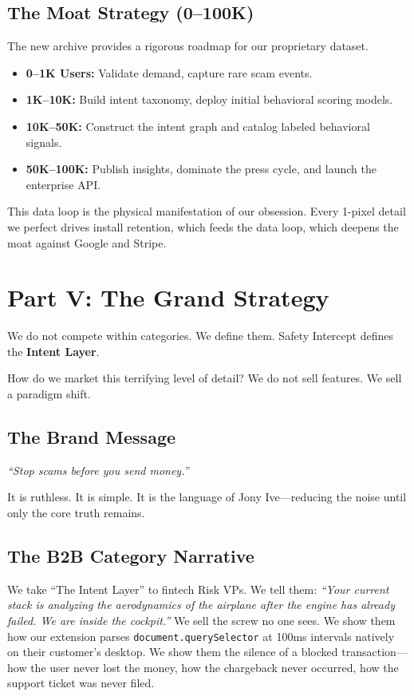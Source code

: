 \documentclass[11pt, letterpaper]{article}
\begin{document}
\subsection*{The Moat Strategy (0--100K)}
The new archive provides a rigorous roadmap for our proprietary dataset. 
\begin{itemize}
    \item \textbf{0--1K Users:} Validate demand, capture rare scam events.
    \item \textbf{1K--10K:} Build intent taxonomy, deploy initial behavioral scoring models.
    \item \textbf{10K--50K:} Construct the intent graph and catalog labeled behavioral signals.
    \item \textbf{50K--100K:} Publish insights, dominate the press cycle, and launch the enterprise API.
\end{itemize}
This data loop is the physical manifestation of our obsession. Every 1-pixel detail we perfect drives install retention, which feeds the data loop, which deepens the moat against Google and Stripe.

\section*{Part V: The Grand Strategy}

We do not compete within categories. We define them. Safety Intercept defines the \textbf{Intent Layer}.

How do we market this terrifying level of detail? We do not sell features. We sell a paradigm shift.

\subsection*{The Brand Message}
\begin{center}
\textit{``Stop scams before you send money.''}
\end{center}
It is ruthless. It is simple. It is the language of Jony Ive---reducing the noise until only the core truth remains.

\subsection*{The B2B Category Narrative}
We take ``The Intent Layer'' to fintech Risk VPs. We tell them: \textit{``Your current stack is analyzing the aerodynamics of the airplane after the engine has already failed. We are inside the cockpit.''} We sell the screw no one sees. We show them how our extension parses \texttt{document.querySelector} at 100ms intervals natively on their customer's desktop. We show them the silence of a blocked transaction---how the user never lost the money, how the chargeback never occurred, how the support ticket was never filed.
\end{document}
